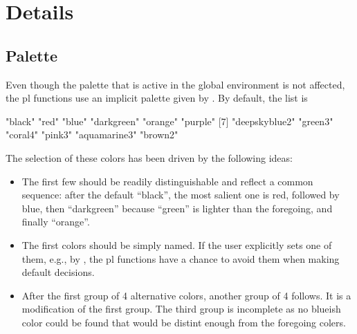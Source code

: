 \documentclass[11pt]{article}
\begin{document}

\section{Details}

\subsection{Palette}
Even though the palette that is active in the global environment is not
affected, the pl functions use an implicit palette given by 
. By default, the list is
\begin{Schunk}
\begin{Soutput}
 [1] "black"        "red"          "blue"         "darkgreen"    "orange"       "purple"      
 [7] "deepskyblue2" "green3"       "coral4"       "pink3"        "aquamarine3"  "brown2"      
\end{Soutput}
\end{Schunk}
The selection of these colors has been driven by the following ideas:
\begin{itemize}
\item 
  The first few should be readily distinguishable and reflect a common 
  sequence: after the default ``black'', the most salient one is red,
  followed by blue, then ``darkgreen'' because ``green'' is lighter than
  the foregoing, and finally ``orange''.
\item
  The first colors should be simply named. If the user explicitly sets one
  of them, e.g., by , the pl
  functions have a chance to avoid them when making default decisions.
\item
  After the first group of 4 alternative colors, another group of 4 follows.
  It is a modification of the first group. The third group is incomplete as
  no blueish color could be found that would be distint enough from the 
  foregoing colers.
\end{itemize}
\end{document}
